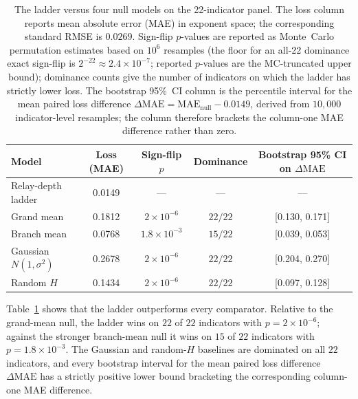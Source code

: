 \begin{table}[t]
\caption{The ladder versus four null models on the 22-indicator panel.
The loss column reports mean absolute error (MAE) in exponent space;
the corresponding standard RMSE is \(0.0269\).
Sign-flip \(p\)-values are reported as Monte~Carlo permutation estimates
based on $10^{6}$ resamples (the floor for an all-22 dominance exact
sign-flip is $2^{-22}\!\approx\!2.4\!\times\!10^{-7}$; reported $p$-values
are the MC-truncated upper bound); dominance counts give the number of indicators
on which the ladder has strictly lower loss.  The bootstrap 95\%~CI column is the
percentile interval for the mean paired loss difference
\(\Delta\mathrm{MAE}=\mathrm{MAE}_{\mathrm{null}}-0.0149\),
derived from \(10{,}000\) indicator-level resamples; the column therefore
brackets the column-one MAE difference rather than zero.}
\label{tab:null_models}
\centering
\begin{tabular}{lcccc}
\toprule
Model & Loss (MAE) & Sign-flip \(p\) & Dominance & Bootstrap 95\% CI on \(\Delta\mathrm{MAE}\) \\
\midrule
Relay-depth ladder & 0.0149 & --- & --- & --- \\
Grand mean & 0.1812 & \(2\times 10^{-6}\) & \(22/22\) & [0.130, 0.171] \\
Branch mean & 0.0768 & \(1.8\times 10^{-3}\) & \(15/22\) & [0.039, 0.053] \\
Gaussian \(N(1,\sigma^2)\) & 0.2678 & \(2\times 10^{-6}\) & \(22/22\) & [0.204, 0.270] \\
Random \(H\) & 0.1434 & \(2\times 10^{-6}\) & \(22/22\) & [0.097, 0.128] \\
\bottomrule
\end{tabular}
\end{table}

Table~\ref{tab:null_models} shows that the ladder outperforms every comparator.
Relative to the grand-mean null, the ladder wins on $22$ of $22$ indicators with
$p=2\times10^{-6}$; against the stronger branch-mean null it wins on
$15$ of $22$ indicators with $p=1.8\times10^{-3}$. The Gaussian and
random-$H$ baselines are dominated on all $22$ indicators, and every
bootstrap interval for the mean paired loss difference \(\Delta\mathrm{MAE}\)
has a strictly positive lower bound bracketing the corresponding
column-one MAE difference.

